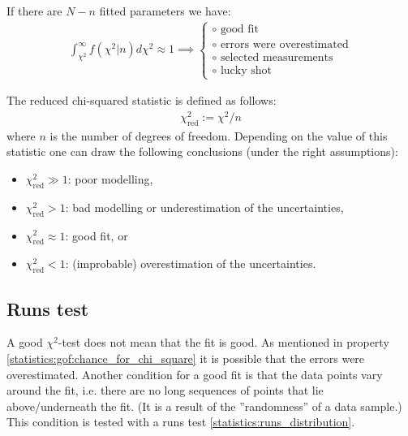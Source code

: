 {    \begin{property}
        If there are $N - n$ fitted parameters we have:
        \begin{gather}
            \label{statistics:gof:chance_for_chi_square}
            \int_{\chi^2}^\infty f\left(\chi^2|n\right)d\chi^2 \approx 1\implies
            \begin{cases}
                \circ\text{ good fit}\\
                \circ\text{ errors were overestimated}\\
                \circ\text{ selected measurements}\\
                \circ\text{ lucky shot}
            \end{cases}
        \end{gather}
    \end{property}
    \begin{property}
        The reduced chi-squared statistic is defined as follows:
        \begin{gather}
            \chi^2_{\text{red}} := \chi^2/n
        \end{gather}
        where $n$ is the number of degrees of freedom. Depending on the value of this statistic one can draw the following conclusions (under the right assumptions):
        \begin{itemize}
            \item $\chi^2_{\text{red}} \gg 1$: poor modelling,
            \item $\chi^2_{\text{red}} > 1$: bad modelling or underestimation of the uncertainties,
            \item $\chi^2_{\text{red}} \approx 1$: good fit, or
            \item $\chi^2_{\text{red}} < 1$: (improbable) overestimation of the uncertainties.
        \end{itemize}
    \end{property}

\subsection{Runs test}

    A good $\chi^2$-test does not mean that the fit is good. As mentioned in property \ref{statistics:gof:chance_for_chi_square} it is possible that the errors were overestimated. Another condition for a good fit is that the data points vary around the fit, i.e. there are no long sequences of points that lie above/underneath the fit. (It is a result of the ''randomness'' of a data sample.) This condition is tested with a runs test \ref{statistics:runs_distribution}.

}
